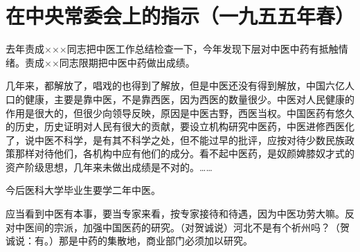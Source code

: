 \section[在中央常委会上的指示（一九五五年春）]{在中央常委会上的指示（一九五五年春）}


去年责成×××同志把中医工作总结检查一下，今年发现下层对中医中药有抵触情绪。责成××同志限期把中医中药做出成绩。

几年来，都解放了，唱戏的也得到了解放，但是中医还没有得到解放，中国六亿人口的健康，主要是靠中医，不是靠西医，因为西医的数量很少。中医对人民健康的作用是很大的，但很少向领导反映，原因是中医古野，西医当权。中国医药有悠久的历史，历史证明对人民有很大的贡献，要设立机构研究中医药，中医进修西医化了，说中医不科学，是有其不科学之处，但不能过早的批评，应按对待少数民族政策那样对待他们，各机构中应有他们的成分。看不起中医药，是奴颜婢膝奴才式的资产阶级思想，几年来未做出成绩是不对的。……

今后医科大学毕业生要学二年中医。

应当看到中医有本事，要当专家来看，按专家接待和待遇，因为中医功劳大嘛。反对中医间的宗派，加强中国医药的研究。（对贺诚说）河北不是有个祈州吗？（贺诚说：有。）那是中药的集散地，商业部门必须加以研究。


